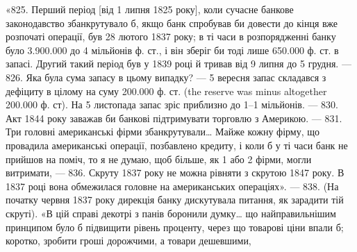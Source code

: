 «825. Перший період [від 1 липня 1825 року], коли сучасне банкове
законодавство збанкрутувало б, якщо банк спробував би довести до кінця вже
розпочаті операції, був 28 лютого 1837 року; в ті часи в розпорядженні банку
було 3.900.000 до 4 мільйонів ф. ст., і він зберіг би тоді лише 650.000 ф. ст.
в запасі. Другий такий період був у 1839 році й тривав від 9 липня до 5 грудня.
— 826. Яка була сума запасу в цьому випадку? — 5 вересня запас
складався з дефіциту в цілому на суму 200.000 ф. ст. (the reserve was minus
altogether 200.000 ф. ст). На 5 листопада запас зріс приблизно до 1--1
мільйонів. — 830. Акт 1844 року заважав би банкові підтримувати торговлю
з Америкою. — 831. Три головні американські фірми збанкрутували\dots{} Майже
кожну фірму, що провадила американські операції, позбавлено кредиту, і
коли б у ті часи банк не прийшов на поміч, то я не думаю, щоб більше, як
1 або 2 фірми, могли витримати, — 836. Скруту 1837 року не можна рівняти
з скрутою 1847 року. В 1837 році вона обмежилася головне на американських
операціях». — 838. (На початку червня 1837 року дирекція банку дискутувала
питання, як зарадити тій скруті). «В цій справі декотрі з панів боронили думку\dots{}
що найправильнішим принципом було б підвищити рівень проценту, через що
товарові ціни впали б; коротко, зробити гроші дорожчими, а товари дешевшими,
\parbreak{}  %
